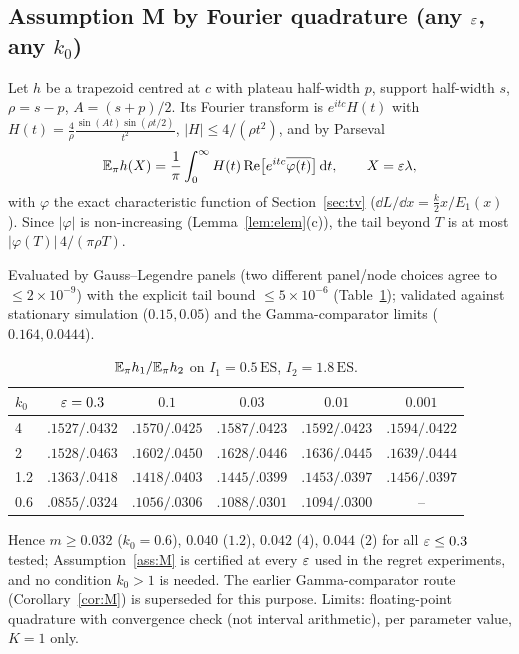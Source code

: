 \subsection{Assumption M by Fourier quadrature (any $\varepsilon$, any $k_0$)}\label{sec:Mexact}

\begin{proposition}\label{prop:Mexact}\Ps{}
Let $h$ be a trapezoid centred at $c$ with plateau half-width $p$, support half-width $s$, $\rho=s-p$, $A=(s+p)/2$. Its Fourier transform is $e^{itc}H(t)$ with $H(t)=\frac4\rho\frac{\sin(At)\sin(\rho t/2)}{t^2}$, $|H|\le4/(\rho t^2)$, and by Parseval
\[
\mathbb{E}_\pi h(X)=\frac1\pi\int_0^\infty H(t)\,\mathrm{Re}\big[e^{itc}\overline{\varphi(t)}\big]\,\mathrm d t,\qquad X=\varepsilon\lambda,
\]
with $\varphi$ the exact characteristic function of Section~\ref{sec:tv} ($\dd L/\dd x=\tfrac k2x/E_1(x)$). Since $|\varphi|$ is non-increasing (Lemma~\ref{lem:elem}(c)), the tail beyond $T$ is at most $|\varphi(T)|\,4/(\pi\rho T)$.
\end{proposition}
Evaluated by Gauss--Legendre panels (two different panel/node choices agree to $\le2\times10^{-9}$) with the explicit tail bound $\le5\times10^{-6}$ (Table~\ref{tab:Mexact}); validated against stationary simulation ($0.15,0.05$) and the Gamma-comparator limits ($0.164,0.0444$).
\begin{table}[h]\centering\small
\begin{tabular}{@{}lccccc@{}}\toprule
$k_0$ & $\varepsilon=0.3$ & $0.1$ & $0.03$ & $0.01$ & $0.001$\\\midrule
4 & $.1527/.0432$ & $.1570/.0425$ & $.1587/.0423$ & $.1592/.0423$ & $.1594/.0422$\\
2 & $.1528/.0463$ & $.1602/.0450$ & $.1628/.0446$ & $.1636/.0445$ & $.1639/.0444$\\
1.2 & $.1363/.0418$ & $.1418/.0403$ & $.1445/.0399$ & $.1453/.0397$ & $.1456/.0397$\\
0.6 & $.0855/.0324$ & $.1056/.0306$ & $.1088/.0301$ & $.1094/.0300$ & --\\\bottomrule
\end{tabular}
\caption{$\mathbb{E}_\pi h_1/\mathbb{E}_\pi h_2$ on $I_1=0.5\,\mathrm{ES}$, $I_2=1.8\,\mathrm{ES}$.}\label{tab:Mexact}
\end{table}
Hence $m\ge0.032$ ($k_0=0.6$), $0.040$ ($1.2$), $0.042$ ($4$), $0.044$ ($2$) for all $\varepsilon\le0.3$ tested; Assumption~\ref{ass:M} is certified at every $\varepsilon$ used in the regret experiments, and no condition $k_0>1$ is needed. The earlier Gamma-comparator route (Corollary~\ref{cor:M}) is superseded for this purpose. Limits: floating-point quadrature with convergence check (not interval arithmetic), per parameter value, $K=1$ only.

